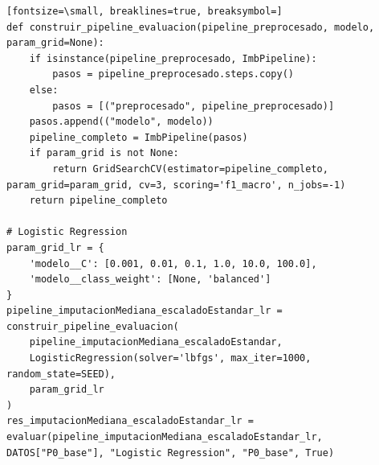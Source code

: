 \documentclass[12pt,a4paper,oneside]{book}
\begin{document}
\begin{iaprompt}
\begin{Verbatim}[fontsize=\small, breaklines=true, breaksymbol=]
def construir_pipeline_evaluacion(pipeline_preprocesado, modelo, param_grid=None):
    if isinstance(pipeline_preprocesado, ImbPipeline):
        pasos = pipeline_preprocesado.steps.copy()
    else:
        pasos = [("preprocesado", pipeline_preprocesado)]
    pasos.append(("modelo", modelo))
    pipeline_completo = ImbPipeline(pasos)
    if param_grid is not None:
        return GridSearchCV(estimator=pipeline_completo, param_grid=param_grid, cv=3, scoring='f1_macro', n_jobs=-1)
    return pipeline_completo

# Logistic Regression
param_grid_lr = {
    'modelo__C': [0.001, 0.01, 0.1, 1.0, 10.0, 100.0],
    'modelo__class_weight': [None, 'balanced']
}
pipeline_imputacionMediana_escaladoEstandar_lr = construir_pipeline_evaluacion(
    pipeline_imputacionMediana_escaladoEstandar,
    LogisticRegression(solver='lbfgs', max_iter=1000, random_state=SEED),
    param_grid_lr
)
res_imputacionMediana_escaladoEstandar_lr = evaluar(pipeline_imputacionMediana_escaladoEstandar_lr, DATOS["P0_base"], "Logistic Regression", "P0_base", True)
\end{Verbatim}
\end{iaprompt}
\end{document}
